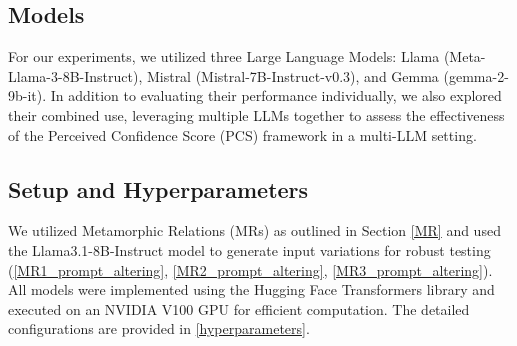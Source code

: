 \subsection{Models}
For our experiments, we utilized three Large Language Models: Llama (Meta-Llama-3-8B-Instruct), Mistral (Mistral-7B-Instruct-v0.3), and Gemma (gemma-2-9b-it). In addition to evaluating their performance individually, we also explored their combined use, leveraging multiple LLMs together to assess the effectiveness of the Perceived Confidence Score (PCS) framework in a multi-LLM setting. 

\subsection{Setup and Hyperparameters}
We utilized Metamorphic Relations (MRs) as outlined in Section \ref{MR} and used the Llama3.1-8B-Instruct model to generate input variations for robust testing (\ref{MR1_prompt_altering}, \ref{MR2_prompt_altering}, \ref{MR3_prompt_altering}). All models were implemented using the Hugging Face Transformers library and executed on an NVIDIA V100 GPU for efficient computation. The detailed configurations are provided in \ref{hyperparameters}.